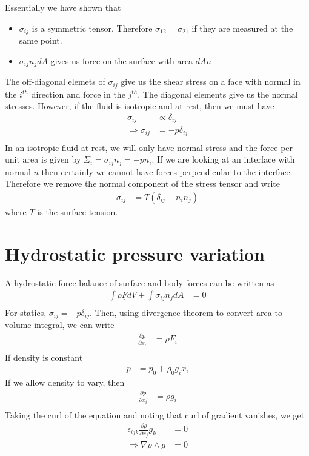 \documentclass[11pt, letterpaper]{article}
\newcommand{\SI}{\Sigma}
\newcommand{\1}{\textbf{1}}
\newcommand{\pd}[2]{\frac{\partial #1}{\partial #2}}
\newcommand{\vect}[1]{\underline{#1}} %
\begin{document}
Essentially we have shown that
\begin{itemize}
\item $\sigma_{ij}$ is a symmetric tensor. Therefore $\sigma_{12} = \sigma_{21}$ if they are measured at the same point.
\item $\sigma_{ij}n_jdA$ gives us force on the surface with area $dA \vect n$
\end{itemize}

The off-diagonal elemets of $\sigma_{ij}$ give us the shear stress on a face with normal in the $i^{th}$ direction and force in the $j^{th}$. The diagonal elements give us the normal stresses. However, if the fluid is isotropic and at rest, then we must have
\begin{align*}
\sigma_{ij} &\propto \delta_{ij} \\
\Rightarrow\sigma_{ij} &= -p \delta_{ij} \\
\end{align*}
In an isotropic fluid at rest, we will only have normal stress and the force per unit area is given by $\SI_i = \sigma_{ij}n_j = -p n_i$. If we are looking at an interface with normal $\vect n$ then certainly we cannot have forces perpendicular to the interface. Therefore we remove the normal component of the stress tensor and write
\begin{align*}
\sigma_{ij} &= T (\delta_{ij} - n_in_j)
\end{align*}
where $T$ is the surface tension.

\section{Hydrostatic pressure variation}
A hydrostatic force balance of surface and body forces can be written as
\begin{align*}
\int \rho \vect F dV + \int \sigma_{ij} n_j dA &= 0\\
\end{align*}
For statics, $\sigma_{ij} = -p \delta_{ij}$. Then, using divergence theorem to convert area to volume integral, we can write
\begin{align*}
\pd{p}{x_i} &= \rho F_i \\
\end{align*}
If density is constant
\begin{align*}
p &= p_0 + \rho_0 g_ix_i
\end{align*}
If we allow density to vary, then 
\begin{align*}
\pd{p}{x_i} &= \rho g_i \\
\end{align*}
Taking the curl of the equation and noting that curl of gradient vanishes, we get
\begin{align*}
\epsilon_{ijk}\pd{\rho}{x_j}g_k &= 0\\
\Rightarrow \nabla \rho \wedge \vect g &= 0
\end{align*}
\end{document}
